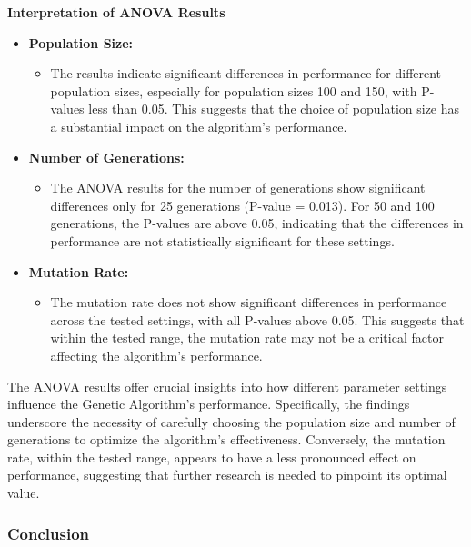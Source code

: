 \documentclass{article}
\begin{document}
    \textbf{Interpretation of ANOVA Results}

    \begin{itemize}
        \item \textbf{Population Size:}
        \begin{itemize}
            \item The results indicate significant differences in performance for different population sizes, especially for population sizes 100 and 150, with P-values less than 0.05. This suggests that the choice of population size has a substantial impact on the algorithm's performance.
        \end{itemize}
        \item \textbf{Number of Generations:}
        \begin{itemize}
            \item The ANOVA results for the number of generations show significant differences only for 25 generations (P-value = 0.013). For 50 and 100 generations, the P-values are above 0.05, indicating that the differences in performance are not statistically significant for these settings.
        \end{itemize}
        \item \textbf{Mutation Rate:}
        \begin{itemize}
            \item The mutation rate does not show significant differences in performance across the tested settings, with all P-values above 0.05. This suggests that within the tested range, the mutation rate may not be a critical factor affecting the algorithm's performance.
        \end{itemize}
    \end{itemize}

    The ANOVA results offer crucial insights into how different parameter settings influence the Genetic Algorithm's performance. Specifically, the findings underscore the necessity of carefully choosing the population size and number of generations to optimize the algorithm's effectiveness. Conversely, the mutation rate, within the tested range, appears to have a less pronounced effect on performance, suggesting that further research is needed to pinpoint its optimal value.

    \subsubsection{Conclusion}
\end{document}
